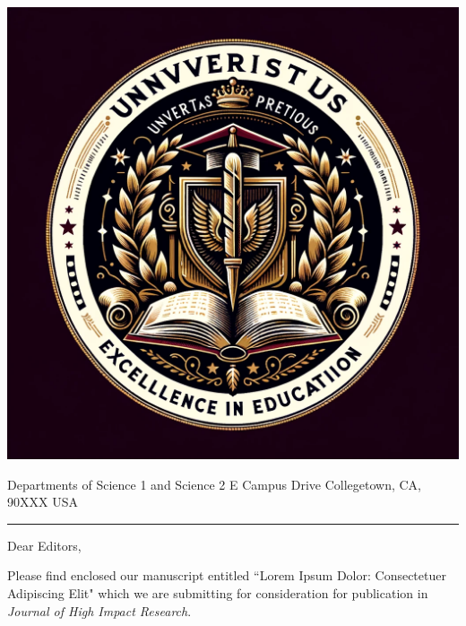 \documentclass[11pt]{article}
\newcommand{\journalname}{Journal of High Impact Research} %
\newcommand{\mybullet}{\textbullet\hspace{0.5em}}
\begin{document}
\noindent
\begin{minipage}[t]{0.18\textwidth}
\vspace{0pt} %
\includegraphics[width=\linewidth]{logos/DALLE_logo.png} %
\end{minipage}
\hfill
\begin{minipage}[t]{0.7\textwidth}
\vspace{25pt} %
{\color{gray}\LARGE Departments of Science 1 and Science 2\color{black}\small{} E Campus Drive \mybullet Collegetown, CA, 90XXX \mybullet USA}
\end{minipage}

\vspace{1em} %
\noindent\rule{\linewidth}{1pt} %
\bigskip

\noindent Dear Editors,

\noindent Please find enclosed our manuscript entitled ``Lorem Ipsum Dolor: Consectetuer Adipiscing Elit" which we are submitting for consideration for publication in \textit{\journalname}.
\end{document}
